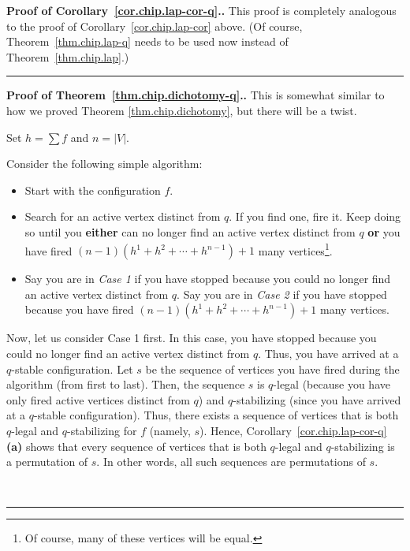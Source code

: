 \documentclass[numbers=enddot,12pt,final,onecolumn,notitlepage]{scrartcl}%
\theoremstyle{definition}
\newenvironment{proof}[1][Proof]{\noindent\textbf{#1.} }{\ \rule{0.5em}{0.5em}}
\let\sumnonlimits\sum
\renewcommand{\sum}{\sumnonlimits\limits}
\begin{document}
\begin{proof}[Proof of Corollary~\ref{cor.chip.lap-cor-q}.]
This proof is completely analogous to the proof
of Corollary~\ref{cor.chip.lap-cor} above.
(Of course, Theorem~\ref{thm.chip.lap-q} needs to be used
now instead of Theorem~\ref{thm.chip.lap}.)
\end{proof}

\begin{proof}[Proof of Theorem~\ref{thm.chip.dichotomy-q}.]
This is somewhat similar to how we proved Theorem \ref{thm.chip.dichotomy},
but there will be a twist.

Set $h=\sum f$ and $n=\left\vert V\right\vert $.

Consider the following simple algorithm:

\begin{itemize}
\item Start with the configuration $f$.

\item Search for an active vertex distinct from $q$. If you find one, fire it.
Keep doing so until you \textbf{either} can no longer find an active vertex
distinct from $q$ \textbf{or} you have fired $\left(  n-1\right)  \left(
h^{1}+h^{2}+\cdots+h^{n-1}\right) +1 $ many vertices\footnote{Of course, many of
these vertices will be equal.}.

\item Say you are in \textit{Case 1} if you have stopped because you could no
longer find an active vertex distinct from $q$. Say you are in \textit{Case 2}
if you have stopped because you have fired $\left(  n-1\right)  \left(
h^{1}+h^{2}+\cdots+h^{n-1}\right) +1 $ many vertices.
\end{itemize}

Now, let us consider Case 1 first. In this case, you have stopped because you
could no longer find an active vertex distinct from $q$. Thus, you have
arrived at a $q$-stable configuration. Let $s$ be the sequence of vertices you
have fired during the algorithm (from first to last). Then, the sequence $s$
is $q$-legal (because you have only fired active vertices distinct from $q$)
and $q$-stabilizing (since you have arrived at a $q$-stable configuration).
Thus, there exists a sequence of vertices that is both $q$-legal and
$q$-stabilizing for $f$ (namely, $s$). Hence,
Corollary~\ref{cor.chip.lap-cor-q} \textbf{(a)} shows that every sequence of
vertices that is both $q$-legal and $q$-stabilizing is a permutation of $s$.
In other words, all such sequences are permutations of $s$.


\end{proof}
\end{document}
